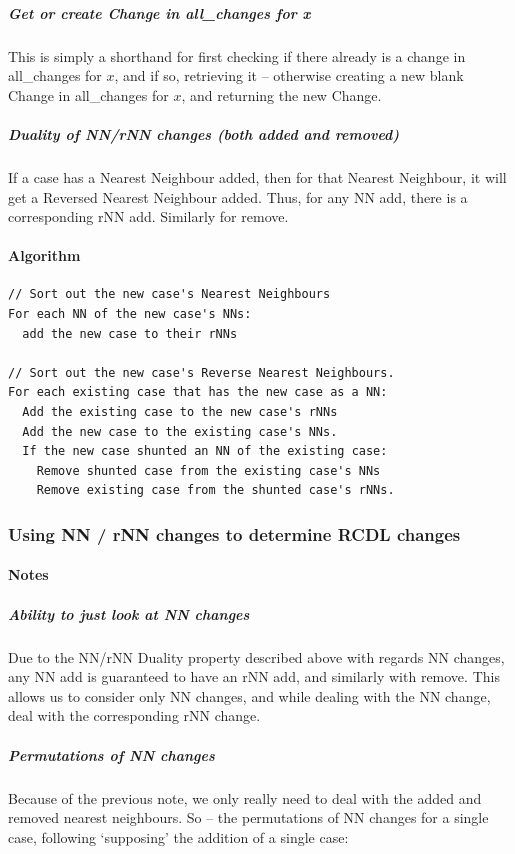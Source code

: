 \documentclass[a4paper,11pt]{report}
\begin{document}
\subparagraph{Get or create Change in all\_changes for x}
This is simply a shorthand for first checking if there already is a change in all\_changes for $x$, and if so, retrieving it – otherwise creating a new blank Change in all\_changes for $x$, and returning the new Change.


\subparagraph{Duality of NN/rNN changes (both added and removed)}
If a case has a Nearest Neighbour added, then for that Nearest Neighbour, it will get a Reversed Nearest Neighbour added. Thus, for any NN add, there is a corresponding rNN add. Similarly for remove.


\paragraph{Algorithm}

\begin{samepage}
{\small 
\begin{verbatim}
// Sort out the new case's Nearest Neighbours
For each NN of the new case's NNs:
  add the new case to their rNNs

// Sort out the new case's Reverse Nearest Neighbours.
For each existing case that has the new case as a NN:
  Add the existing case to the new case's rNNs
  Add the new case to the existing case's NNs.
  If the new case shunted an NN of the existing case:
    Remove shunted case from the existing case's NNs
    Remove existing case from the shunted case's rNNs.
\end{verbatim}
}
\end{samepage}

\subsubsection{Using NN / rNN changes to determine RCDL changes}
\paragraph{Notes}
\subparagraph{Ability to just look at NN changes}
Due to the NN/rNN Duality property described above with regards NN changes, any NN add is guaranteed to have an rNN add, and similarly with remove. This allows us to consider only NN changes, and while dealing with the NN change, deal with the corresponding rNN change.

\subparagraph{Permutations of NN changes}
Because of the previous note, we only really need to deal with the added and removed nearest neighbours. So – the permutations of NN changes for a single case, following `supposing' the addition of a single case:
\end{document}
